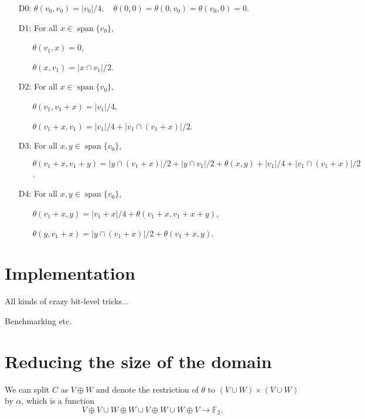 \documentclass[a4paper,debug]{tufte-handout}
\DeclareMathOperator{\Span}{span}
\newcommand{\F}{\mathbb{F}}
\theoremstyle{plain}
\theoremstyle{definition}
\theoremstyle{remark}
\begin{document}
\begin{itemize}

	\item[D0:] $\theta(v_0,v_0) = |v_0|/4,\quad \theta(0,0) = \theta(0,v_0) = \theta(v_0,0) = 0$.

	\item[D1:] For all $x \in \Span\{v_0\}$, 
	\begin{itemize}
		\item[] $\theta(v_1,x) = 0$, 
		\item[] $\theta(x,v_1) = |x\cap v_1|/2$.
	\end{itemize}

	\item[D2:] For all $x \in \Span\{v_0\}$,
	\begin{itemize}
	 	\item[] $\theta(v_1,v_1+x) = |v_1|/4$,
	 	\item[] $\theta(v_1 + x,v_1) = |v_1|/4 + |v_1\cap(v_1+x)|/2$.
	 \end{itemize} 
	 \item[D3:] For all $x,y\in \Span\{v_0\}$,
	 \begin{itemize}
	 	\item[] $\theta(v_1+x,v_1+y) = |y\cap(v_1+x)|/2 + |y\cap v_1|/2 + \theta(x,y) + |v_1|/4 + |v_1\cap(v_1+x)|/2$.
	 \end{itemize}
	 \item[D4:] For all $x,y\in \Span\{v_0\}$,
	 \begin{itemize}
	 	\item[] $\theta(v_1+x,y) = |v_1+x|/4 + \theta(v_1+x,v_1+x+y)$,
	 	\item[] $\theta(y,v_1+x) = |y\cap(v_1+x)|/2 + \theta(v_1+x,y)$.
	 \end{itemize}

\end{itemize} 

\section{Implementation}

All kinds of crazy bit-level tricks...

Benchmarking etc.

\section{Reducing the size of the domain} 
We can split $C$ as $V\oplus W$ and denote the restriction of $\theta$ to $(V\cup W)\times (V \cup W)$ by $\alpha$, which is a function
\[
	V\oplus V \cup W\oplus W \cup V\oplus W \cup W\oplus V \to \F_2.
\]
\end{document}
